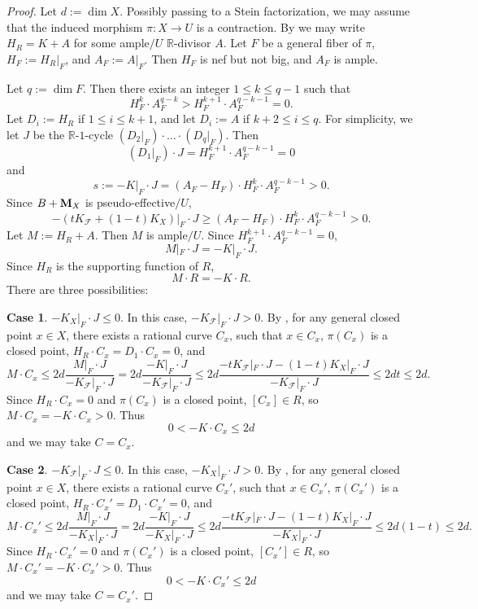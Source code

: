 \documentclass[12pt]{amsart}
\numberwithin{equation}{section}
\newcommand{\Mm}{{\bf{M}}}
\newcommand{\Rr}{\mathbb{R}}
\newcommand{\Ff}{\mathcal{F}}
\theoremstyle{definition}
\theoremstyle{definition}
\theoremstyle{definition}
\begin{document}
\begin{proof}
Let $d:=\dim X$. Possibly passing to a Stein factorization, we may assume that the induced morphism $\pi: X\rightarrow U$ is a contraction. By \cite[Lemma 8.4.1]{CHLX23} we may write $H_R=K+A$ for some ample$/U$ $\Rr$-divisor $A$. Let $F$ be a general fiber of $\pi$, $H_F:=H_R|_F$, and $A_F:=A|_F$. Then $H_F$ is nef but not big, and $A_F$ is ample. 

Let $q:=\dim F$. Then there exists an integer $1\leq k\leq q-1$ such that
$$H_F^k\cdot A_F^{q-k}>H_F^{k+1}\cdot A_F^{q-k-1}=0.$$
Let $D_i:=H_R$ if $1\leq i\leq k+1$, and let $D_i:=A$ if $k+2\leq i\leq q$. For simplicity, we let $J$ be the $\Rr$-$1$-cycle $(D_2|_F)\cdot\dots\cdot(D_q|_F)$. Then
$$(D_1|_F)\cdot J=H_F^{k+1}\cdot A_F^{q-k-1}=0$$
and
$$s:=-K|_F\cdot J=(A_F-H_F)\cdot H_F^{k}\cdot A_F^{q-k-1}>0.$$
Since $B+\Mm_X$ is pseudo-effective$/U$,
$$-(tK_{\Ff}+(1-t)K_X)|_F\cdot J\geq (A_F-H_F)\cdot H_F^{k}\cdot A_F^{q-k-1}>0.$$
Let $M:=H_R+A$. Then $M$ is ample$/U$. Since $H_F^{k+1}\cdot A_F^{q-k-1}=0$,
$$M|_F\cdot J=-K|_F\cdot J.$$
Since $H_R$ is the supporting function of $R$,
$$M\cdot R=-K\cdot R.$$
There are three possibilities:

\medskip

\noindent\textbf{Case 1}. $-K_X|_F\cdot J\leq 0$. In this case, $-K_{\Ff}|_F\cdot J>0$. By \cite[Theorem 8.1.1]{CHLX23}, for any general closed point $x\in X$, there exists a rational curve $C_x$, such that $x\in C_x$, $\pi(C_x)$ is a closed point, $H_R\cdot C_x=D_1\cdot C_x=0$, and
$$M\cdot C_x\leq 2d\frac{M|_F\cdot J}{-K_{\Ff}|_F\cdot J}=2d\frac{-K|_F\cdot J}{-K_{\Ff}|_F\cdot J}\leq 2d\frac{-tK_{\Ff}|_F\cdot J-(1-t)K_X|_F\cdot J}{-K_{\Ff}|_F\cdot J}\leq 2dt\leq 2d.$$
Since $H_R\cdot C_x=0$ and $\pi(C_x)$ is a closed point, $[C_x]\in R$, so $M\cdot C_x=-K\cdot C_x>0$. Thus
$$0<-K\cdot C_x\leq 2d$$
and we may take $C=C_x$.


\medskip

\noindent\textbf{Case 2}. $-K_{\Ff}|_F\cdot J\leq 0$. In this case, $-K_X|_F\cdot J>0$. By \cite[Theorem 8.1.1]{CHLX23}, for any general closed point $x\in X$, there exists a rational curve $C_x'$, such that $x\in C_x'$, $\pi(C_x')$ is a closed point, $H_R\cdot C_x'=D_1\cdot C_x'=0$, and 
$$M\cdot C_x'\leq 2d\frac{M|_F\cdot J}{-K_{X}|_F\cdot J}=2d\frac{-K|_F\cdot J}{-K_{X}|_F\cdot J}\leq 2d\frac{-tK_{\Ff}|_F\cdot J-(1-t)K_X|_F\cdot J}{-K_{X}|_F\cdot J}\leq 2d(1-t)\leq 2d.$$
Since $H_R\cdot C_x'=0$ and $\pi(C_x')$ is a closed point, $[C_x']\in R$, so $M\cdot C_x'=-K\cdot C_x'>0$. Thus
$$0<-K\cdot C_x'\leq 2d$$
and we may take $C=C_x'$.


\end{proof}
\end{document}
